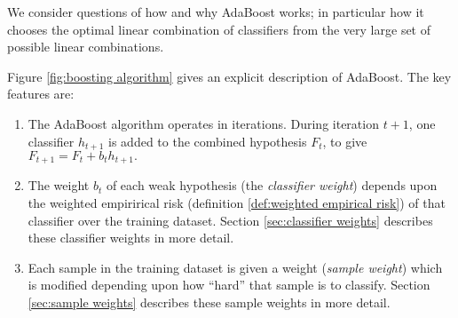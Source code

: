 We consider questions of how and why AdaBoost works; in particular how
it chooses the optimal linear combination of classifiers from the very
large set of possible linear combinations. 

Figure \ref{fig:boosting algorithm} gives an explicit description of
AdaBoost.  The key features are:
%
\begin{enumerate}
\item	The AdaBoost algorithm operates in iterations.  During
	iteration $t+1$, one classifier $h_{t+1}$ is added to the combined
	hypothesis $F_{t}$, to give $F_{t+1} = F_t + b_t h_{t+1}.$
\item	The weight $b_t$ of each weak hypothesis (the \emph{classifier
	weight}) depends upon the weighted empirirical risk
	(definition \ref{def:weighted empirical risk}) of that
	classifier over the training dataset.  Section
	\ref{sec:classifier weights} describes these classifier
	weights in more detail.
\item	Each sample in the training dataset is given a weight
	(\emph{sample weight}) which is modified depending upon how
	``hard'' that sample is to classify.  Section \ref{sec:sample
	weights} describes these sample weights in more detail.
\end{enumerate}

